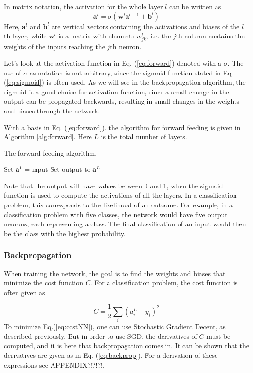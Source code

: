 In matrix notation, the activation for the whole layer $l$ can be written as
\begin{equation}\label{eq:forward}
	\boldsymbol{a}^l = \sigma\left(\boldsymbol{w}^l\boldsymbol{a}^{l-1}+\boldsymbol{b}^l\right)
\end{equation}
Here, $\boldsymbol{a}^l$ and $\boldsymbol{b}^l$ are vertical vectors containing the activations and biases of the $l$th layer, while $\boldsymbol{w}^l$ is a matrix with elements $w^l_{jk}$, i.e. the $j$th column contains the weights of the inputs reaching the $j$th neuron.  

Let's look at the activation function in Eq. (\ref{eq:forward}) denoted with a $\sigma$. The use of $\sigma$ as notation is not arbitrary, since the sigmoid function stated in Eq. (\ref{eq:sigmoid}) is often used. As we will see in the backpropagation algorithm, the sigmoid is a good choice for activation function, since a small change in the output can be propagated backwards, resulting in small changes in the weights and biases through the network.


With a basis in Eq. (\ref{eq:forward}), the algorithm for forward feeding is given in Algorithm \ref{alg:forward}. Here $L$ is the total number of layers. 
\begin{algorithm}[htbp]\caption{The forward feeding algorithm.}\label{alg:forward}
	\SetAlgoLined
	\BlankLine
	\BlankLine
	Set $\boldsymbol{a}^1$ = input\;
	Set output to $\boldsymbol{a}^L$\;
	\BlankLine
	\BlankLine
\end{algorithm}

Note that the output will have values between 0 and 1, when the sigmoid function is used to compute the activations of all the layers. In a classification problem, this corresponds to the likelihood of an outcome. For example, in a classification problem with five classes, the network would have five output neurons, each representing a class. The final classification of an input would then be the class with the highest probability. 

\subsubsection*{Backpropagation}
When training the network, the goal is to find the weights and biases that minimize the cost function $C$. For a classification problem, the cost function is often given as

\begin{equation}\label{eq:costNN}
	C = \frac{1}{2}\sum_{i}\left(a^L_i-y_i\right)^2
\end{equation}  
To minimize Eq.(\ref{eq:costNN}), one can use Stochastic Gradient Decent, as described previously. But in order to use SGD, the derivatives of $C$ must be computed, and it is here that backpropagation comes in. It can be shown that the derivatives are given as in Eq. (\ref{eq:backprop}). For a derivation of these expressions see APPENDIX?!?!?!. 

